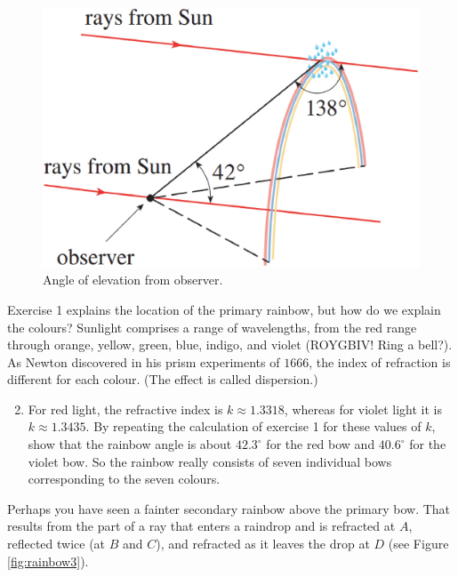 \begin{figure}[h]
	\centering
	\includegraphics[scale=0.25]{activities/math112/figures/Rainbow2.eps}
	\caption{Angle of elevation from observer.}
	\label{fig:rainbow2}
\end{figure}

Exercise 1 explains the location of the primary rainbow, but how do we explain the colours? Sunlight comprises a range of wavelengths, from the red range through orange, yellow, green, blue, indigo, and violet (ROYGBIV! Ring a bell?). As Newton discovered in his prism experiments of $1666$, the index of refraction is different for each colour. (The effect is called dispersion.)

\begin{enumerate}
\setcounter{enumi}{1}
	\item For red light, the refractive index is $k \approx 1.3318$, whereas for violet light it is $k \approx 1.3435$. By repeating the calculation of exercise 1 for these values of $k$, show that the rainbow angle is about $42.3^\circ$ for the red bow and $40.6^\circ$ for the violet bow. So the rainbow really consists of seven individual bows corresponding to the seven colours.
\end{enumerate}

Perhaps you have seen a fainter secondary rainbow above the primary bow. That results from the part of a ray that enters a raindrop and is refracted at $A$, reflected twice (at $B$ and $C$), and refracted as it leaves the drop at $D$ (see Figure \ref{fig:rainbow3}). 
	
